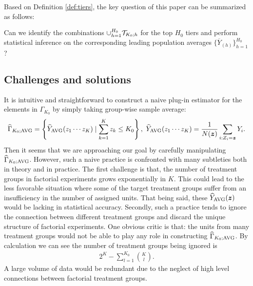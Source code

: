 \documentclass[12pt]{article}
\begin{document}
Based on Definition \ref{def:tiers},  the key question of this paper can be summarized as follows: 
\begin{displayquote}
Can we identify the combinations  $\cup_{h=1}^{H_0} {\mathcal{T}}_{K_0;h}$ for the top $H_0$ tiers and perform statistical inference on the corresponding leading population averages $\{\overline{Y}_{(h)}\}_{h=1}^{H_0}$?
\end{displayquote}





\subsection{Challenges and solutions}
It is intuitive and straightforward to construct a naive plug-in estimator for the elements in $\Gamma_{K_0}$ by simply taking group-wise sample average:
\begin{align*}
    {\widehat{\Gamma}}_{K_0;\operatorname{AVG}} = \left\{\widehat{Y}_{\operatorname{AVG}}(z_1\cdots z_K)\mid \sum_{k=1}^K{z_k} \le K_0\right\}, ~\widehat{Y}_{\operatorname{AVG}}(z_1\cdots z_K) = \frac{1}{N({\boldsymbol{z}})} \sum_{i:Z_i = {\boldsymbol{z}}} Y_i.
\end{align*} 
Then it seems that we are approaching our goal by carefully manipulating ${\widehat{\Gamma}}_{K_0;\operatorname{AVG}}$. However, such a naive practice is confronted with many subtleties both in theory and in practice. The first challenge is that, the number of treatment groups in factorial experiments grows exponentially in $K$. This could lead to the less favorable situation where some of the target treatment groups suffer from an insufficiency in the number of assigned units. That being said, these $\widehat{Y}_{\operatorname{AVG}}({\boldsymbol{z}})$ would be lacking in statistical accuracy. Secondly, such a practice tends to ignore the connection between different treatment groups and discard the unique structure of factorial experiments. One obvious critic is that: the units from many  treatment groups would not be able to play any role in constructing ${\widehat{\Gamma}}_{K_0;\operatorname{AVG}}$. By calculation we can see the number of treatment groups being ignored is
\begin{align*}
    2^K - \sum_{l=1}^{K_0} {K \choose l}.
\end{align*}
A large volume of data would be redundant due to the neglect of high level connections between factorial treatment groups.
\end{document}

